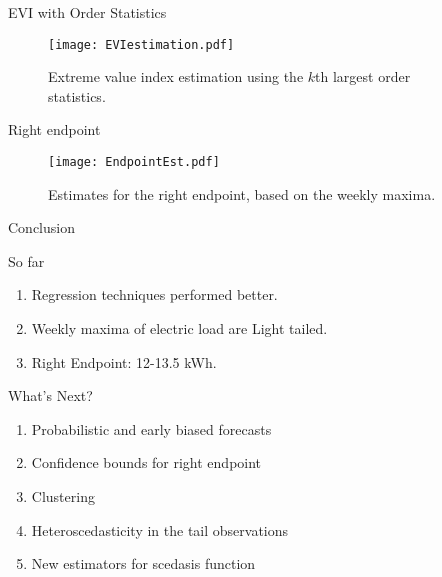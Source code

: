 \documentclass{beamer}
\begin{document}
\begin{frame}{EVI with Order Statistics }
\begin{figure}
\begin{center}
\texttt{[image: EVIestimation.pdf]}
\caption{Extreme value index estimation using the $k$th largest order statistics.} \label{fig:POTEst}
\end{center}
\end{figure}
\end{frame}

\begin{frame}{Right endpoint}
\begin{figure}
\begin{center}
\texttt{[image: EndpointEst.pdf]}
\caption{Estimates for the right endpoint, based on the weekly maxima.} \label{fig:EndPointEst}
\end{center}
\end{figure}
\end{frame}

\begin{frame}[plain,c]

\begin{center}
\Huge Conclusion
\end{center}

\end{frame}

\begin{frame}{So far}
\begin{enumerate}
\item Regression techniques performed better.
\item Weekly maxima of electric load are Light tailed.
\item Right Endpoint: 12-13.5 kWh.
\end{enumerate}
\end{frame}

\begin{frame}{What's Next?}
\begin{enumerate}
\item Probabilistic and early biased forecasts
\item Confidence bounds for right endpoint
\item Clustering
\item Heteroscedasticity in the tail observations
\item New estimators for scedasis function
\end{enumerate}
\end{frame}
\end{document}
